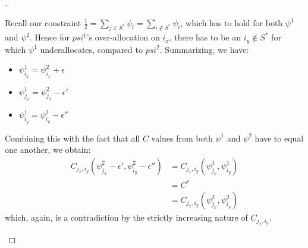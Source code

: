 \begin{proof}[]
\begin{enumerate}[(i)]
\begin{itemize}
      Recall our constraint $\frac{1}{2} = \sum_{j \in S^*} \psi_l = \sum_{i \notin S^*} \psi_i$, which has to hold for both $\psi^1$ and $\psi^2$.
      Hence for $psi^1$'s over-allocation on $i_x$, there has to be an $i_y \notin S^*$ for which $\psi^1$ underallocates, compared to $psi^2$.
      Summarizing, we have:
      \begin{itemize}
        \item $\psi^1_{i_x} = \psi^2_{i_x} + \epsilon$
        \item $\psi^1_{j_x} = \psi^2_{j_x} - \epsilon'$
        \item $\psi^1_{i_y} = \psi^2_{i_y} - \epsilon''$
      \end{itemize}
      Combining this with the fact that all $C$ values from both $\psi^1$ and $\psi^2$ have to equal one another, we obtain:
      \begin{align}
        C_{j_x, i_y}(\psi^2_{j_x} - \epsilon', \psi^2_{i_y} - \epsilon'') &= C_{j_x, i_y}(\psi^1_{j_x}, \psi^1_{i_y}) \\
        &= C^* \\
        &= C_{j_x, i_y}(\psi^2_{j_x}, \psi^2_{i_y})
      \end{align}
      which, again, is a contradiction by the strictly increasing nature of $C_{j_x, i_y}$.
    \end{itemize}
  \end{enumerate}
\end{proof}

